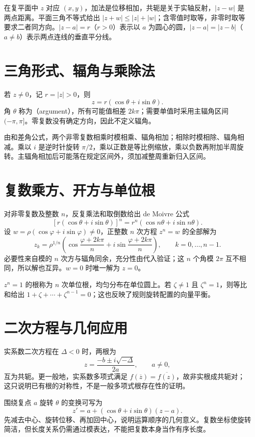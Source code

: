 \documentclass[UTF8]{ctexbook}
\begin{document}
在复平面中 $z$ 对应 $(x,y)$，加法是位移相加，共轭是关于实轴反射，$|z-w|$ 是两点距离。平面三角不等式给出 $|z+w|\le|z|+|w|$；含零值时取等，非零时取等要求二者同方向。$|z-a|=r$（$r>0$）表示以 $a$ 为圆心的圆，$|z-a|=|z-b|$（$a\ne b$）表示两点连线的垂直平分线。

\section{三角形式、辐角与乘除法}
若 $z\ne0$，记 $r=|z|>0$，则
\[
 z=r(\cos\theta+i\sin\theta).
\]
角 $\theta$ 称为（argument），所有可能值相差 $2k\pi$；需要单值时采用主辐角区间 $(-\pi,\pi]$。零复数没有确定方向，因此不定义辐角。

由和差角公式，两个非零复数相乘时模相乘、辐角相加；相除时模相除、辐角相减。乘以 $i$ 是逆时针旋转 $\pi/2$，乘以正数是等比例缩放，乘以负数再附加半周旋转。主辐角相加后可能落在规定区间外，须加减整周重新归入区间。

\section{复数乘方、开方与单位根}
对非零复数及整数 $n$，反复乘法和取倒数给出 de Moivre 公式
\[
 [r(\cos\theta+i\sin\theta)]^n
 =r^n(\cos n\theta+i\sin n\theta).
\]
设 $w=\rho(\cos\varphi+i\sin\varphi)\ne0$，正整数 $n$ 次方程 $z^n=w$ 的全部解为
\[
 z_k=\rho^{1/n}\left(\cos\frac{\varphi+2k\pi}{n}
       +i\sin\frac{\varphi+2k\pi}{n}\right),
 \qquad k=0,\ldots,n-1.
\]
必要性来自模的 $n$ 次方与辐角同余，充分性由代入验证；这 $n$ 个角模 $2\pi$ 互不相同，所以解也互异。$w=0$ 时唯一解为 $z=0$。

$z^n=1$ 的根称为 $n$ 次单位根，均匀分布在单位圆上。若 $\zeta\ne1$ 且 $\zeta^n=1$，则等比和给出 $1+\zeta+\cdots+\zeta^{n-1}=0$；这也反映了规则旋转配置的向量平衡。

\section{二次方程与几何应用}
实系数二次方程在 $\Delta<0$ 时，两根为
\[
 z=\frac{-b\pm i\sqrt{-\Delta}}{2a},\qquad a\ne0,
\]
互为共轭。更一般地，实系数多项式满足 $f(\overline z)=\overline{f(z)}$，故非实根成共轭对；这只说明已有根的对称性，不是一般多项式根存在性的证明。

围绕复点 $a$ 旋转 $\theta$ 的变换可写为
\[
 z'=a+(\cos\theta+i\sin\theta)(z-a).
\]
先减去中心、旋转位移、再加回中心，说明运算顺序的几何意义。复数坐标使旋转简洁，但长度关系仍需通过模表达，不能把复数本身当作有序长度。
\end{document}
